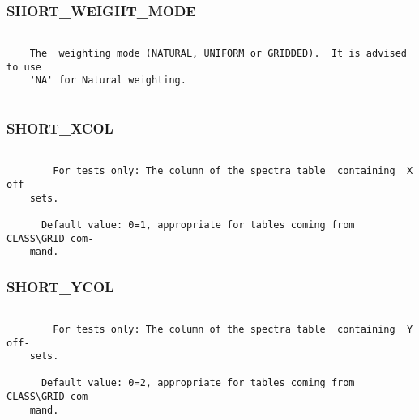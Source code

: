 \subsubsection{SHORT\_WEIGHT\_MODE}
\begin{verbatim}

    The  weighting mode (NATURAL, UNIFORM or GRIDDED).  It is advised to use
    'NA' for Natural weighting.


\end{verbatim}
\subsubsection{SHORT\_XCOL}
\begin{verbatim}

        For tests only: The column of the spectra table  containing  X  off-
    sets.

      Default value: 0=1, appropriate for tables coming from CLASS\GRID com-
    mand.

\end{verbatim}
\subsubsection{SHORT\_YCOL}
\begin{verbatim}

        For tests only: The column of the spectra table  containing  Y  off-
    sets.

      Default value: 0=2, appropriate for tables coming from CLASS\GRID com-
    mand.

\end{verbatim}
